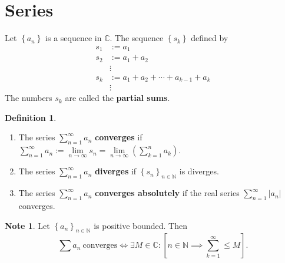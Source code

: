 \documentclass[12pt,openany]{book}
\theoremstyle{definition}
\newtheorem{definition}{Definition}[chapter]
\newtheorem*{note}{Note}
\newcommand{\set}[1]{\left\{#1\right\}}
\newcommand{\N}{\mathbb{N}}
\newcommand{\C}{\mathbb{C}}
\newcommand{\of}[1]{\left( #1 \right)}
\newcommand{\abs}[1]{\left\lvert #1 \right\rvert}
\begin{document}
	\section{Series}
	Let $\set{a_n}$ is a sequence in $\C$. The sequence $\set{s_k}$ defined by \begin{align*}
	s_1 &:= a_1 \\
	s_2 &:= a_1+a_2 \\
	&\vdots\\
	s_k&:=a_1+a_2+\cdots+a_{k-1}+a_k\\
	&\vdots
	\end{align*} The numbers $s_k$ are called the \textbf{partial sums}.
	\vspace{8pt}
	\begin{tcolorbox}[colback=white,colframe=defcolor,arc=5pt,title={\color{white}\bf Convergence of Series}]
		\begin{definition}
			\ \begin{enumerate}[(1)]
				\item The series $\sum_{n=1}^\infty a_n$ \textbf{converges} if $\sum_{n=1}^\infty a_n:=\lim\limits_{n\to\infty}s_n=\lim\limits_{n\to\infty}\of{\sum_{k=1}^na_k}$.
				\item The series $\sum_{n=1}^\infty a_n$ \textbf{diverges} if $\set{s_n}_{n\in\N}$ is diverges.
				\item The series $\sum_{n=1}^\infty a_n$ \textbf{converges absolutely} if the real series $\sum_{n=1}^\infty\abs{a_n}$ converges.
			\end{enumerate}
		\end{definition}
	\end{tcolorbox}
	\vspace{8pt}
	\begin{note}
		Let $\set{a_n}_{n\in\N}$ is positive bounded. Then \[
		\sum a_n\ \text{converges}\iff\exists M\in\C:\left[n\in\N\implies\sum_{k=1}^\infty\leq M\right].
		\]
	\end{note}
	\vspace{4pt}
\end{document}

